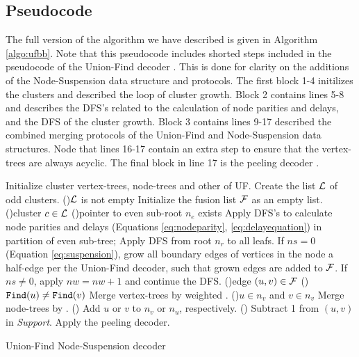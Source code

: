 \subsection{Pseudocode}\label{sec:pseudocode}

The full version of the algorithm we have described is given in Algorithm \ref{algo:ufbb}. Note that this pseudocode includes shorted steps included in the pseudocode of the Union-Find decoder \cite{delfosse2017almost}. This is done for clarity on the additions of the Node-Suspension data structure and protocols. The first block 1-4 initilizes the clusters and described the loop of cluster growth. Block 2 contains lines 5-8 and describes the DFS's related to the calculation of node parities and delays, and the DFS of the cluster growth. Block 3 contains lines 9-17 described the combined merging protocols of the Union-Find and Node-Suspension data structures. Node that lines 16-17 contain an extra step to ensure that the vertex-trees are always acyclic. The final block in line 17 is the peeling decoder \cite{delfosse2017linear}. 
\begin{algorithm}[htbp]
    \BlankLine
    \BlankLine
    Initialize cluster vertex-trees, node-trees and other of UF.\;
    Create the list $\mathcal{L}$ of odd clusters.\;
    \While(){$\mathcal{L}$ is not empty}{
      Initialize the fusion list $\mathcal{F}$ as an empty list.\;
      \For(){cluster $c\in\mathcal{L}$}{
        \If(){pointer to even sub-root $n_e$ exists}{
          Apply DFS's to calculate node parities and delays (Equations \eqref{eq:nodeparity}, \eqref{eq:delayequation}) in partition of even sub-tree;
        }
        Apply DFS from root $n_r$ to all leafs. If $ns=0$ (Equation \eqref{eq:suspension}), grow all boundary edges of vertices in the node a half-edge per the Union-Find decoder, such that grown edges are added to $\mathcal{F}$. If $ns\neq0$, apply $nw=nw+1$ and continue the DFS.\;
      }
      \For(){edge $(u,v) \in \mathcal{F}$}{
        \eIf(){$\texttt{Find}(u)\neq\texttt{Find}(v)$}{
          Merge vertex-trees by weighted .\;
          \eIf(){$u \in n_v$ and $v \in n_v$}{
            Merge node-trees by .\;
          }(){
            Add $u$ or $v$ to $n_v$ or $n_u$, respectively.\;
          }
        }(){
          Subtract 1 from $(u,v)$ in \emph{Support}.\;
        }
      }
    }
    Apply the peeling decoder.
    \caption{Union-Find Node-Suspension decoder}\label{algo:ufbb}
  \end{algorithm}
    